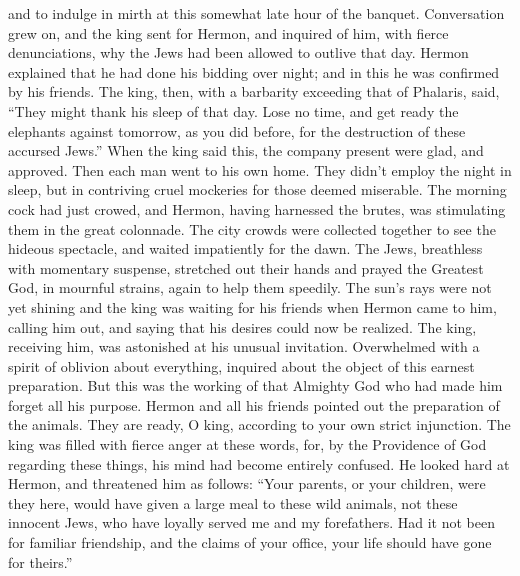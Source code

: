 and to indulge in mirth at this somewhat late hour of the banquet.
 Conversation grew on, and the king sent for Hermon, and
inquired of him, with fierce denunciations, why the Jews had been
allowed to outlive that day.  Hermon explained that he had
done his bidding over night; and in this he was confirmed by his
friends.  The king, then, with a barbarity exceeding that
of Phalaris, said, ``They might thank his sleep of that day. Lose no
time, and get ready the elephants against tomorrow, as you did before,
for the destruction of these accursed Jews.''  When the
king said this, the company present were glad, and approved. Then each
man went to his own home.  They didn't employ the night in
sleep, but in contriving cruel mockeries for those deemed miserable.
 The morning cock had just crowed, and Hermon, having
harnessed the brutes, was stimulating them in the great colonnade.
 The city crowds were collected together to see the hideous
spectacle, and waited impatiently for the dawn.  The Jews,
breathless with momentary suspense, stretched out their hands and prayed
the Greatest God, in mournful strains, again to help them speedily.
 The sun's rays were not yet shining and the king was
waiting for his friends when Hermon came to him, calling him out, and
saying that his desires could now be realized.  The king,
receiving him, was astonished at his unusual invitation. Overwhelmed
with a spirit of oblivion about everything, inquired about the object of
this earnest preparation.  But this was the working of that
Almighty God who had made him forget all his purpose. 
Hermon and all his friends pointed out the preparation of the animals.
They are ready, O king, according to your own strict injunction.
 The king was filled with fierce anger at these words, for,
by the Providence of God regarding these things, his mind had become
entirely confused. He looked hard at Hermon, and threatened him as
follows:  ``Your parents, or your children, were they here,
would have given a large meal to these wild animals, not these innocent
Jews, who have loyally served me and my forefathers.  Had
it not been for familiar friendship, and the claims of your office, your
life should have gone for theirs.''

